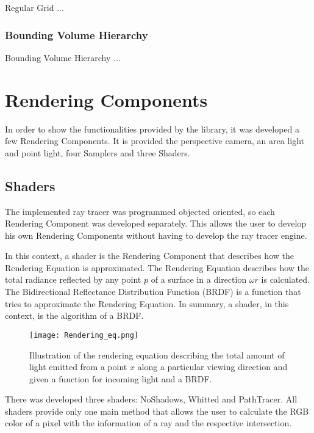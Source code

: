 \par
Regular Grid ...

\subsubsection{Bounding Volume Hierarchy}

\par
Bounding Volume Hierarchy ...

\section{Rendering Components}

\par
In order to show the functionalities provided by the library, it was developed a few Rendering Components.
It is provided the perspective camera, an area light and point light, four Samplers and three Shaders.

\subsection{Shaders}

\par
The implemented ray tracer was programmed objected oriented, so each Rendering Component was developed separately.
This allows the user to develop his own Rendering Components without having to develop the ray tracer engine.

\par
In this context, a shader is the Rendering Component that describes how the Rendering Equation is approximated.
The Rendering Equation describes how the total radiance reflected by any point
$p$
of a surface in a direction
$\omega$$r$
is calculated.
The Bidirectional Reflectance Distribution Function (BRDF) is a function that tries to approximate the Rendering Equation.
In summary, a shader, in this context, is the algorithm of a BRDF.

\begin{figure}[H]
	\centering
	\caption{Illustration of the rendering equation describing the total amount of light emitted from a point
	$x$
	along a particular viewing direction and given a function for incoming light and a BRDF.}
	\label{Rendering_Equation.}
	\texttt{[image: Rendering\_eq.png]}
\end{figure}

\par
There was developed three shaders: NoShadows, Whitted and PathTracer.
All shaders provide only one main method that allows the user to calculate the RGB color of a pixel with the information of a ray and the respective intersection.

